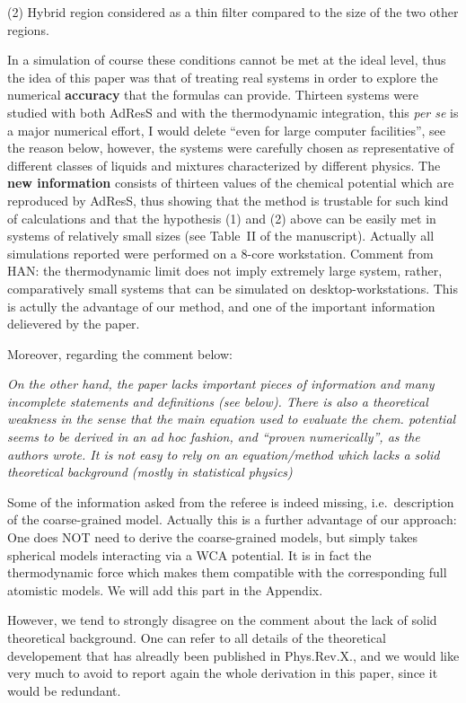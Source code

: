 \documentclass[12pt]{article}
\newcommand{\recheck}[1]{{\color{red} #1}}
\begin{document}
(2) Hybrid region considered as a thin filter compared to the size of the two other regions.

In a simulation of course these conditions cannot be met at the ideal
level, 
thus the idea of this paper was that of treating real systems
in order to explore the numerical {\bf accuracy} that the formulas can
provide. Thirteen systems were studied with both AdResS and with the
thermodynamic integration, this {\it per se} is a major numerical
effort, \recheck{I would delete ``even for large computer facilities'', see the reason below}, however, the systems were
carefully chosen as representative of different classes of liquids and
mixtures characterized by different physics. The {\bf new information}
consists of thirteen values of the chemical potential which are
reproduced by AdResS, thus showing that the method is trustable for
such kind of calculations and that the hypothesis (1) and (2) above
can be easily met in \recheck{systems of relatively small sizes (see Table~II of the manuscript). Actually
  all simulations reported were performed on a 8-core workstation.}
\recheck{Comment from HAN: the thermodynamic limit does not imply extremely large system,
  rather, comparatively small systems that can be simulated on desktop-workstations.
  This is actully the advantage of our method, and one of the important information
  delievered by the paper.}

Moreover, regarding the comment below:

{\it On the other hand, the paper lacks important pieces of
  information and many incomplete statements and definitions (see
  below). There is also a theoretical weakness in the sense that the
  main equation used to evaluate the chem. potential seems to be
  derived in an ad hoc fashion, and ``proven numerically'', as the
  authors wrote. It is not easy to rely on an equation/method which
  lacks a solid theoretical background (mostly in statistical
  physics)}

Some of the information asked from the referee is indeed missing,
i.e.~description of the coarse-grained model. \recheck{Actually  this is} a
further advantage of our approach: One does NOT need to derive the
\recheck{coarse-grained models}, but simply takes spherical models interacting via a WCA
potential. It is in fact the thermodynamic force which makes them
compatible with the corresponding full atomistic models. We will add this part in
the Appendix.

However, we tend to strongly disagree on the comment about the lack of
solid theoretical background. \recheck{One can refer to all details of
  the theoretical developement that has alreadly been published in
  Phys.Rev.X.,} and we would like very much to avoid to report again
the whole derivation \recheck{ in this paper, since it would be redundant.}
\end{document}
